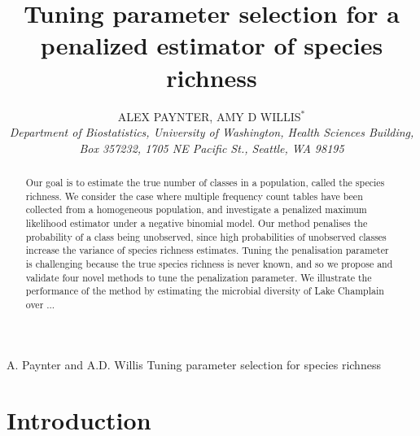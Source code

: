 \documentclass[oupdraft]{bio}
\begin{document}
\title{Tuning parameter selection for a penalized estimator of species richness}

\author{ALEX PAYNTER, AMY D WILLIS$^\ast$\\[4pt]
\textit{Department of Biostatistics,
University of Washington,
Health Sciences Building, Box 357232,
1705 NE Pacific St., Seattle, WA 98195}
}

\markboth%
{A. Paynter and A.D. Willis}
{Tuning parameter selection for species richness}

\maketitle


\begin{abstract}
{Our goal is to estimate the true number of classes in a population, called the species richness.  We consider the case where multiple frequency count tables have been collected from a homogeneous population, and investigate a penalized maximum likelihood estimator under a negative binomial model.
Our method penalises the probability of a class being unobserved, since high probabilities of unobserved classes increase the variance of species richness estimates. Tuning the penalisation parameter is challenging because the true species richness is never known, and so we propose and validate four novel methods to tune the penalization parameter.  We illustrate the performance of the method by estimating the microbial diversity of Lake Champlain over ...}
\end{abstract}



\section{Introduction}
\label{sec:introduction}
\end{document}
